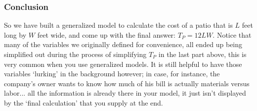 \documentclass{ximera}
\begin{document}
\begin{example}
\begin{itemize}
        \end{itemize}
        
    
    \subsubsection*{Conclusion}
    
        So we have built a generalized model to calculate the cost of a patio that is $L$ feet long by $W$ feet wide, and come up with the final answer: $T_P = 12LW$. Notice that many of the variables we originally defined for convenience, all ended up being simplified out during the process of simplifying $T_P$ in the last part above, this is very common when you use generalized models. It is still helpful to have those variables `lurking' in the background however; in case, for instance, the company's owner wants to know how much of his bill is actually materials versus labor... all the information is already there in your model, it just isn't displayed by the `final calculation' that you supply at the end.

\end{example}
\end{document}
